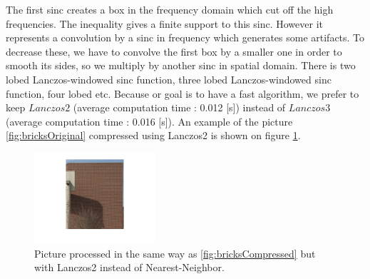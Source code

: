 The first sinc creates a box in the frequency domain which cut off the high frequencies. The inequality gives a finite support to this sinc. However it represents a convolution by a sinc in frequency which generates some artifacts. To decrease these, we have to convolve the first box by a smaller one in order to smooth its sides, so we multiply by another sinc in spatial domain. 
There is two lobed Lanczos-windowed sinc function, three lobed Lanczos-windowed sinc function, four lobed etc. Because or goal is to have a fast algorithm, we prefer to keep $Lanczos2$ (average computation time :  0.012 [s]) instead of $Lanczos3$ (average computation time : 0.016 [s]). An example of the picture \ref{fig:bricksOriginal} compressed using Lanczos2 is shown on figure \ref{fig:bricksLanczos}.

\begin{figure}
\centering
\includegraphics[width = 0.4\textwidth]{../Images/bricksLanczos.png}
\caption{Picture processed in the same way as \ref{fig:bricksCompressed} but with Lanczos2 instead of Nearest-Neighbor.}
\label{fig:bricksLanczos}
\end{figure}
%
